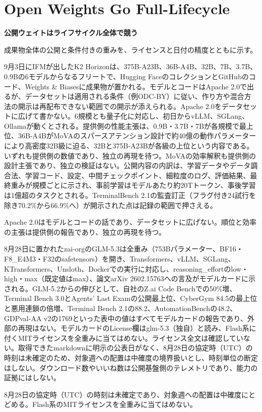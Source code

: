 \section{Open Weights Go Full-Lifecycle}
\begin{wideflow}
{\Large\bfseries 公開ウェイトはライフサイクル全体で競う}\par
\smallskip
{\color{SurveyMuted}成果物全体の公開と条件付きの重みを、ライセンスと日付の精度とともに示す。}\par
\end{wideflow}

9月3日にIFMが出したK2 Horizonは、375B-A23B、36B-A4B、32B、7B、3.7B、0.9Bの6モデルからなるフリートで、Hugging FaceのコレクションとGitHubのコード、Weights \& Biasesに成果物が置かれる\cite{k2horizon}。モデルとコードはApache 2.0で出るが、データセットは適用される条件（例ODC-BY）に従い、作り方や混合方法の開示は再配布できない範囲での開示が添えられる。Apache 2.0をデータセットに広げて書かない。6規模とも量子化に対応し、初日からvLLM、SGLang、Ollamaが動くとされる。提供側の性能主張は、0.9B・3.7B・7Bが各規模で最上位、36B-A4BがMoVAのスパースアテンション設計で約40億の動作パラメーターにより高密度32B級に迫る、32Bと375B-A23Bが各級の上位という内容である。いずれも提供側の数値であり、独立の再現を待つ。MoVAの効率解釈も提供側の設計主張であり、独立の検証はない。公開内容の内訳は、学習データやデータ調合法、学習コード、設定、中間チェックポイント、細粒度のログ、評価結果、最終重みが規模ごとに示され、事前学習はモデルあたり約20Tトークン、事後学習は1億超のタスクとされる。TerminalBench 2.1の監査訂正（フラグ付き24試行を除き70.2\%から66.9\%へ）が開示された点は記録の範囲で押さえる。

\begin{claimboundary}[ライセンスの境界]
Apache 2.0はモデルとコードの話であり、データセットに広げない。順位と効率の主張は提供側の報告であり、独立の再現を待つ。
\end{claimboundary}

8月28日に置かれたzai-orgのGLM-5.3は全重み（753Bパラメーター、BF16・F8\_E4M3・F32のsafetensors）を開き、Transformers、vLLM、SGLang、KTransformers、Unsloth、Dockerでの実行に対応し、reasoning\_effortのlow・high・max（既定値はmax）、論文arXiv 2602.15763への言及がモデルカードに示される\cite{glm53weights}。GLM-5.2からの伸びとして、自社のZ.ai Code Benchでの50\%増、Terminal Bench 3.0とAgents' Last Examの公開最上位、CyberGym 84.5の最上位と悪用連鎖の倍増、Terminal Bench 2.1の88.2、AutomationBenchの48.2、GDPval-AA v2の1769といった表中の値はすべてモデルカードの報告であり、外部の再現はない。モデルカードのLicense欄はglm-5.3（独自）と読み、Flash系に付くMITライセンスを全重みに当てはめない。ライセンス全文は確認していない。取得できたmarkdownに明示の公表日がなく、8月28日の協定時（UTC）の時刻は未確定のため、対象週への配置は中確度の境界扱いとし、時刻単位の断定はしない。ダウンロード数やいいね数は公開基盤側のテレメトリであり、能力の証拠にはしない。

\begin{technicalnote}[日付とライセンスの注意]
8月28日の協定時（UTC）の時刻は未確定であり、対象週への配置は中確度にとどめる。Flash系のMITライセンスを全重みに当てはめない\cite{glm53weights}。
\end{technicalnote}
